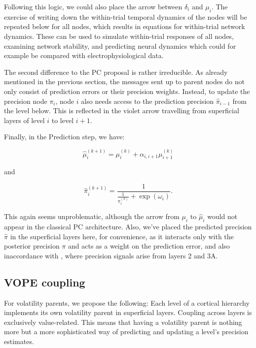 Following this logic, we could also place the arrow between $\delta_i$ and $\mu_i$. The exercise of writing down the within-trial temporal dynamics of the nodes will be repeated below for all nodes, which results in equations for within-trial network dynamics. These can be used to simulate within-trial responses of all nodes, examining network stability, and predicting neural dynamics which could for example be compared with electrophysiological data. 

The second difference to the \textsf{PC} proposal is rather irreducible. As already mentioned in the previous section, the messages sent up to parent nodes do not only consist of prediction errors or their precision weights. Instead, to update the precision node $\pi_i$, node $i$ also needs access to the prediction precision $\hat{\pi}_{i-1}$ from the level below. This is reflected in the violet arrow travelling from superficial layers of level $i$ to level $i+1$. 

Finally, in the \textsf{Prediction} step, we have:

\begin{equation}
	\hat{\mu}_i^{(k+1)} = \mu_i^{(k)} + \alpha_{i,i+1} \mu_{i+1}^{(k)}
\end{equation}

and

\begin{equation}
	\hat{\pi}_i^{(k+1)} = \frac{1}{\frac{1}{\pi_i^{(k)}} + \exp(\omega_i)}.
\end{equation}


This again seems unproblematic, although the arrow from $\mu_i$ to $\hat{\mu}_i$ would not appear in the classical \textsf{PC} architecture. Also, we've placed the predicted precision $\hat{\pi}$ in the superficial layers here, for convenience, as it interacts only with the posterior precision $\pi$ and acts as a weight on the prediction error, and also inaccordance with \cite{Shipp2016}, where precision signals arise from layers 2 and 3A. 

\subsection{VOPE coupling}
For volatility parents, we propose the following: Each level of a cortical hierarchy implements its own volatility parent in superficial layers. Coupling across layers is exclusively value-related. This means that having a volatility parent is nothing more but a more sophisticated way of predicting and updating a level's precision estimates. \\

